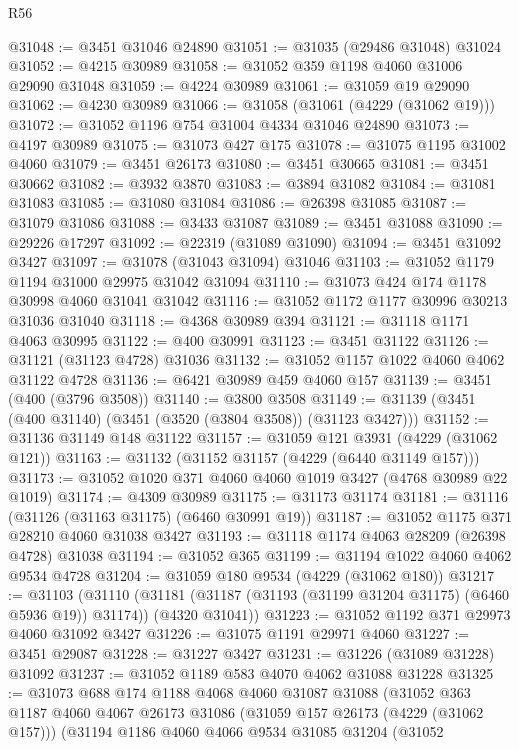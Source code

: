 \begin{lexlean}{R56}
\begin{coremodule}
@31048 := @3451 @31046 @24890
@31051 := @31035 (@29486 @31048) @31024
@31052 := @4215 @30989
@31058 := @31052 @359 @1198 @4060 @31006 @29090 @31048
@31059 := @4224 @30989
@31061 := @31059 @19 @29090
@31062 := @4230 @30989
@31066 := @31058 (@31061 (@4229 (@31062 @19)))
@31072 := @31052 @1196 @754 @31004 @4334 @31046 @24890
@31073 := @4197 @30989
@31075 := @31073 @427 @175
@31078 := @31075 @1195 @31002 @4060
@31079 := @3451 @26173
@31080 := @3451 @30665
@31081 := @3451 @30662
@31082 := @3932 @3870
@31083 := @3894 @31082
@31084 := @31081 @31083
@31085 := @31080 @31084
@31086 := @26398 @31085
@31087 := @31079 @31086
@31088 := @3433 @31087
@31089 := @3451 @31088
@31090 := @29226 @17297
@31092 := @22319 (@31089 @31090)
@31094 := @3451 @31092 @3427
@31097 := @31078 (@31043 @31094) @31046
@31103 := @31052 @1179 @1194 @31000 @29975 @31042 @31094
@31110 := @31073 @424 @174 @1178 @30998 @4060 @31041 @31042
@31116 := @31052 @1172 @1177 @30996 @30213 @31036 @31040
@31118 := @4368 @30989 @394
@31121 := @31118 @1171 @4063 @30995
@31122 := @400 @30991
@31123 := @3451 @31122
@31126 := @31121 (@31123 @4728) @31036
@31132 := @31052 @1157 @1022 @4060 @4062 @31122 @4728
@31136 := @6421 @30989 @459 @4060 @157
@31139 := @3451 (@400 (@3796 @3508))
@31140 := @3800 @3508
@31149 := @31139 (@3451 (@400 @31140) (@3451 (@3520 (@3804 @3508)) (@31123 @3427)))
@31152 := @31136 @31149 @148 @31122
@31157 := @31059 @121 @3931 (@4229 (@31062 @121))
@31163 := @31132 (@31152 @31157 (@4229 (@6440 @31149 @157)))
@31173 := @31052 @1020 @371 @4060 @4060 @1019 @3427 (@4768 @30989 @22 @1019)
@31174 := @4309 @30989
@31175 := @31173 @31174
@31181 := @31116 (@31126 (@31163 @31175) (@6460 @30991 @19))
@31187 := @31052 @1175 @371 @28210 @4060 @31038 @3427
@31193 := @31118 @1174 @4063 @28209 (@26398 @4728) @31038
@31194 := @31052 @365
@31199 := @31194 @1022 @4060 @4062 @9534 @4728
@31204 := @31059 @180 @9534 (@4229 (@31062 @180))
@31217 := @31103
    (@31110
      (@31181 (@31187 (@31193 (@31199 @31204 @31175) (@6460 @5936 @19)) @31174))
      (@4320 @31041))
@31223 := @31052 @1192 @371 @29973 @4060 @31092 @3427
@31226 := @31075 @1191 @29971 @4060
@31227 := @3451 @29087
@31228 := @31227 @3427
@31231 := @31226 (@31089 @31228) @31092
@31237 := @31052 @1189 @583 @4070 @4062 @31088 @31228
@31325 := @31073
    @688
    @174
    @1188
    @4068
    @4060
    @31087
    @31088
    (@31052
      @363
      @1187
      @4060
      @4067
      @26173
      @31086
      (@31059 @157 @26173 (@4229 (@31062 @157)))
      (@31194
        @1186
        @4060
        @4066
        @9534
        @31085
        @31204
        (@31052

\end{coremodule}
\end{lexlean}

